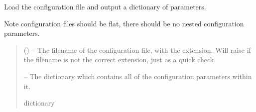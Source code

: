 \documentclass[letterpaper,11pt,english]{sphinxmanual}
\begin{document}

\begin{savenotes}\begin{fulllineitems}
\label{\detokenize{code/lezargus.library.config:lezargus.library.config.load_configuration_file}}
\pysigstartsignatures
{}
\pysigstopsignatures
\sphinxAtStartPar
Load the configuration file and output a dictionary of parameters.

\sphinxAtStartPar
Note configuration files should be flat, there should be no nested
configuration parameters.
\begin{quote}\begin{description}
\sphinxAtStartPar
{} () – The filename of the configuration file, with the extension. Will raise
if the filename is not the correct extension, just as a quick check.

\sphinxAtStartPar
{} – The dictionary which contains all of the configuration parameters
within it.

\sphinxAtStartPar
dictionary

\end{description}\end{quote}

\end{fulllineitems}\end{savenotes}

\end{document}

